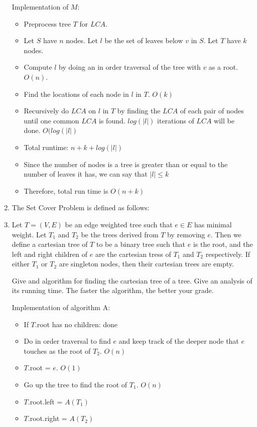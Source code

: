 \documentclass[12pt]{article}
\begin{document}
\begin{enumerate}
    Implementation of $M$:
    \begin{itemize}
        \item Preprocess tree $T$ for $LCA$.
        \item Let $S$ have $n$ nodes. Let ${l}$ be the set of leaves below $v$
            in $S$. Let $T$ have $k$ nodes.
        \item Compute ${l}$ by doing an in order traversal of the tree with $v$
            as a root. $O(n)$.
        \item Find the locations of each node in ${l}$ in $T$. $O(k)$
        \item Recursively do $LCA$ on ${l}$ in $T$ by finding the $LCA$ of each
            pair of nodes until one common $LCA$ is found. $log(|{l}|)$ iterations
            of $LCA$ will be done. $O(log(|{l}|)$
        \item Total runtime: $n + k + log({|l|})$
        \item Since the number of nodes is a tree is greater than or equal to
            the number of leaves it has, we can say that $|{l}| \leq k$
        \item Therefore, total run time is $O(n+k)$
    \end{itemize}


\item The Set Cover Problem is defined as follows:

\item Let $T = (V,E)$ be an edge weighted tree such that $e \in E$ has minimal
    weight.  Let $T_1$ and $T_2$ be the trees derived from $T$ by removing $e$.
    Then we define a cartesian tree of $T$ to be a binary tree such that $e$ is
    the root, and the left and right children of $e$ are the cartesian tress of
    $T_1$ and $T_2$ respectively. If either $T_1$ or $T_2$ are singleton nodes,
    then their cartesian trees are empty.

    Give and algorithm for finding the cartesian tree of a tree. Give an
    analysis of its running time. The faster the algorithm, the better your
    grade.

    Implementation of algorithm A:
    \begin{itemize}
        \item If $T$.root has no children: done
        \item Do in order traversal to find $e$ and keep track of the deeper
            node that $e$ touches as the root of $T_2$. $O(n)$
        \item $T$.root = $e$. $O(1)$
        \item Go up the tree to find the root of $T_1$. $O(n)$
        \item $T$.root.left = $A(T_1)$
        \item $T$.root.right = $A(T_2)$
    \end{itemize}


\end{enumerate}
\end{document}

